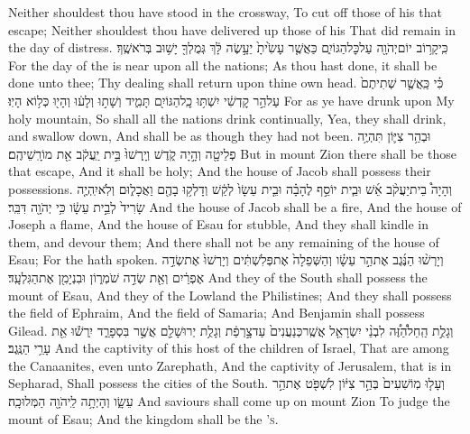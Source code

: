 {Neither shouldest thou have stood in the crossway, To cut off those of his that escape; Neither shouldest thou have delivered up those of his That did remain in the day of distress.}
{כִּֽי\maqqaf קָר֥וֹב יוֹם\maqqaf יְהֹוָ֖ה עַל\maqqaf כׇּל\maqqaf הַגּוֹיִ֑ם כַּאֲשֶׁ֤ר עָשִׂ֙יתָ֙ יֵעָ֣שֶׂה לָּ֔ךְ גְּמֻלְךָ֖ יָשׁ֥וּב בְּרֹאשֶֽׁךָ׃}
{For the day of the \lord\space is near upon all the nations; As thou hast done, it shall be done unto thee; Thy dealing shall return upon thine own head.}
{כִּ֗י כַּֽאֲשֶׁ֤ר שְׁתִיתֶם֙ עַל\maqqaf הַ֣ר קׇדְשִׁ֔י יִשְׁתּ֥וּ כׇֽל\maqqaf הַגּוֹיִ֖ם תָּמִ֑יד וְשָׁת֣וּ וְלָע֔וּ וְהָי֖וּ כְּל֥וֹא הָיֽוּ׃}
{For as ye have drunk upon My holy mountain, So shall all the nations drink continually, Yea, they shall drink, and swallow down, And shall be as though they had not been.}
{וּבְהַ֥ר צִיּ֛וֹן תִּהְיֶ֥ה פְלֵיטָ֖ה וְהָ֣יָה קֹ֑דֶשׁ וְיָֽרְשׁוּ֙ בֵּ֣ית יַֽעֲקֹ֔ב אֵ֖ת מוֹרָֽשֵׁיהֶֽם׃}
{But in mount Zion there shall be those that escape, And it shall be holy; And the house of Jacob shall possess their possessions.}
{וְהָיָה֩ בֵית\maqqaf יַעֲקֹ֨ב אֵ֜שׁ וּבֵ֧ית יוֹסֵ֣ף לֶהָבָ֗ה וּבֵ֤ית עֵשָׂו֙ לְקַ֔שׁ וְדָלְק֥וּ בָהֶ֖ם וַאֲכָל֑וּם וְלֹֽא\maqqaf יִֽהְיֶ֤ה שָׂרִיד֙ לְבֵ֣ית עֵשָׂ֔ו כִּ֥י יְהֹוָ֖ה דִּבֵּֽר׃}
{And the house of Jacob shall be a fire, And the house of Joseph a flame, And the house of Esau for stubble, And they shall kindle in them, and devour them; And there shall not be any remaining of the house of Esau; For the \lord\space hath spoken.}
{וְיָרְשׁ֨וּ הַנֶּ֜גֶב אֶת\maqqaf הַ֣ר עֵשָׂ֗ו וְהַשְּׁפֵלָה֙ אֶת\maqqaf פְּלִשְׁתִּ֔ים וְיָרְשׁוּ֙ אֶת\maqqaf שְׂדֵ֣ה אֶפְרַ֔יִם וְאֵ֖ת שְׂדֵ֣ה שֹׁמְר֑וֹן וּבִנְיָמִ֖ן אֶת\maqqaf הַגִּלְעָֽד׃}
{And they of the South shall possess the mount of Esau, And they of the Lowland the Philistines; And they shall possess the field of Ephraim, And the field of Samaria; And Benjamin shall possess Gilead.}
{וְגָלֻ֣ת הַֽחֵל\maqqaf הַ֠זֶּ֠ה לִבְנֵ֨י יִשְׂרָאֵ֤ל אֲשֶֽׁר\maqqaf כְּנַעֲנִים֙ עַד\maqqaf צָ֣רְפַ֔ת וְגָלֻ֥ת יְרוּשָׁלַ֖͏ִם אֲשֶׁ֣ר בִּסְפָרַ֑ד יִֽרְשׁ֕וּ אֵ֖ת עָרֵ֥י הַנֶּֽגֶב׃}
{And the captivity of this host of the children of Israel, That are among the Canaanites, even unto Zarephath, And the captivity of Jerusalem, that is in Sepharad, Shall possess the cities of the South.}
{וְעָל֤וּ מֽוֹשִׁעִים֙ בְּהַ֣ר צִיּ֔וֹן לִשְׁפֹּ֖ט אֶת\maqqaf הַ֣ר עֵשָׂ֑ו וְהָיְתָ֥ה לַֽיהֹוָ֖ה הַמְּלוּכָֽה׃}
{And saviours shall come up on mount Zion To judge the mount of Esau; And the kingdom shall be the \lord\textsc{’s}.}
